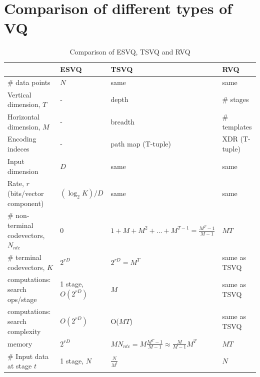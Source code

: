 \section{Comparison of different types of VQ}
\label{sec:comparison_VQ}
\begin{table}[htp]
\begin{longtable}{| p{2.2in} || p{1in} | p{1.5in} | p{1.5in}|}
\hline
											&ESVQ						&TSVQ																&RVQ								\\ 
\hline
\# data points								&$N$						&same																&same								\\ 
\hline
Vertical dimension, $T$					&-							&depth																&\# stages							\\
Horizontal dimension, $M$					&-							&breadth															&\# templates						\\
Encoding indeces							&-							&path map	(T-tuple)												&XDR (T-tuple)						\\ 
\hline
Input dimension							&$D$						&same																&same								\\
Rate, $r$ (bits/vector component)			&$(\log_2K)/D$			&same																&same								\\ 
\hline
\# non-terminal codevectors, $N_{ntc}$	&0							&$1+M+M^2+ \ldots + M^{T-1}=\frac{M^T-1}{M-1}$			&$MT$								\\
\# terminal codevectors, $K$				&$2^{rD}$					&$2^{rD}=M^T$													&same as TSVQ					\\
\hline
computations: search ops/stage			&1 stage, $O(2^{rD})$	&$M$																&same as TSVQ					\\
computations: search complexity 			&$O(2^{rD})$				&O($MT$)															&same  as TSVQ					\\ 
memory 									&$2^{rD}$					&$MN_{ntc} = M\frac{M^T-1}{M-1}\approx\frac{M}{M-1}M^T$ &$MT$								\\ 
\hline
\# Input data at stage $t$					&1 stage, $N$				&$\frac{N}{M^t}$													&$N$								\\
\hline
\end{longtable}
\caption{Comparison of ESVQ, TSVQ and RVQ}
\label{tab:comparison_ESVQ_TSVQ_RVQ}
\end{table}




